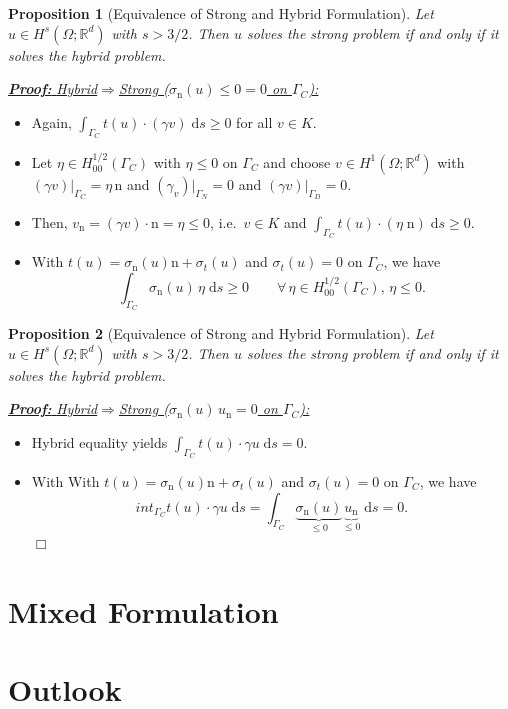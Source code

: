 \documentclass[10pt,aspectratio=169]{beamer}
\newtheorem{proposition}{Proposition}[section]
\def\R{{\mathbb R}}
\def\d{{\mathrm{d}}}
\def\ds{{\d s}}
\def\eop{\hfill{$\Box$}}
\begin{document}
\begin{frame}
	\begin{proposition}[Equivalence of Strong and Hybrid Formulation]
		Let $u\in H^s(\Omega;\R^d)$ with $s>3/2$. Then $u$ solves the strong problem if and only if it solves the hybrid problem.
	\end{proposition}
	\underline{\textbf{\em Proof:} {\em Hybrid\enspace}$\Longrightarrow${\em\enspace Strong ($\sigma_\mathrm{n}(u)\le 0 = 0$ on $\Gamma_C$):}}
	\begin{itemize}
		\item Again, $\displaystyle \int_{\Gamma_C} t(u)\cdot (\gamma v)\;\ds \ge 0$ for all $v\in K$.
		\item Let $\eta\in H_{00}^{1/2}(\Gamma_C)$ with $\eta\le 0$ on $\Gamma_C$ and choose $v\in H^1(\Omega;\R^d)$ with $(\gamma v)|_{\Gamma_C} = \eta\,\mathrm{n}$ and $(\gamma_v)|_{\Gamma_N} = 0$ and $(\gamma v)|_{\Gamma_D} = 0$.
		\item Then, $v_\mathrm{n} = (\gamma v)\cdot\mathrm{n} = \eta\le 0$, i.e.\ $v\in K$ and $\displaystyle \int_{\Gamma_C}t(u)\cdot(\eta\;\mathrm{n})\;\ds\ge 0$.
		\item With $t(u)=\sigma_\mathrm{n}(u)\mathrm{n}+\sigma_t(u)$ and $\sigma_t(u) = 0$ on $\Gamma_C$, we have
		      \begin{equation*}
			      \int_{\Gamma_C}\sigma_\mathrm{n}(u)\,\eta\;\ds \ge 0\qquad \forall\,\eta\in H_{00}^{1/2}(\Gamma_C),\, \eta \le 0.
		      \end{equation*}
	\end{itemize}
\end{frame}

\begin{frame}
	\begin{proposition}[Equivalence of Strong and Hybrid Formulation]
		Let $u\in H^s(\Omega;\R^d)$ with $s>3/2$. Then $u$ solves the strong problem if and only if it solves the hybrid problem.
	\end{proposition}
	\underline{\textbf{\em Proof:} {\em Hybrid\enspace}$\Longrightarrow${\em\enspace Strong ($\sigma_\mathrm{n}(u)\,u_\mathrm{n} = 0$ on $\Gamma_C$):}}
	\begin{itemize}
		\item Hybrid equality yields $\displaystyle \int_{\Gamma_C} t(u)\cdot\gamma u\;\ds = 0$.
		\item With With $t(u)=\sigma_\mathrm{n}(u)\mathrm{n}+\sigma_t(u)$ and $\sigma_t(u) = 0$ on $\Gamma_C$, we have
		      \begin{equation*}
			      int_{\Gamma_C} t(u)\cdot\gamma u\;\ds  = \int_{\Gamma_C} \underbrace{\sigma_\mathrm{n}(u)}_{\le 0}\underbrace{u_\mathrm{n}}_{\le 0}\;\ds = 0.
		      \end{equation*}\eop
	\end{itemize}
\end{frame}

\section{Mixed Formulation}

\section{Outlook}
\end{document}
